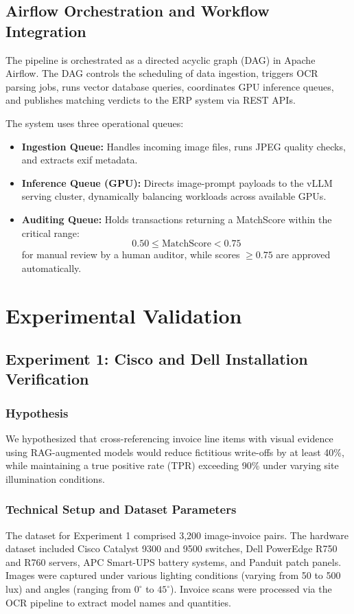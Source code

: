 \documentclass[11pt,letterpaper]{report}
\begin{document}
\section{Airflow Orchestration and Workflow Integration}

The pipeline is orchestrated as a directed acyclic graph (DAG) in Apache Airflow. The DAG controls the scheduling of data ingestion, triggers OCR parsing jobs, runs vector database queries, coordinates GPU inference queues, and publishes matching verdicts to the ERP system via REST APIs.

The system uses three operational queues:
\begin{itemize}
    \item \textbf{Ingestion Queue:} Handles incoming image files, runs JPEG quality checks, and extracts exif metadata.
    \item \textbf{Inference Queue (GPU):} Directs image-prompt payloads to the vLLM serving cluster, dynamically balancing workloads across available GPUs.
    \item \textbf{Auditing Queue:} Holds transactions returning a MatchScore within the critical range:
    \[
    0.50 \le \text{MatchScore} < 0.75
    \]
    for manual review by a human auditor, while scores $\ge 0.75$ are approved automatically.
\end{itemize}

\chapter{Experimental Validation}

\section{Experiment 1: Cisco and Dell Installation Verification}

\subsection{Hypothesis}
We hypothesized that cross-referencing invoice line items with visual evidence using RAG-augmented models would reduce fictitious write-offs by at least 40\%, while maintaining a true positive rate (TPR) exceeding 90\% under varying site illumination conditions.

\subsection{Technical Setup and Dataset Parameters}
The dataset for Experiment 1 comprised 3,200 image-invoice pairs. The hardware dataset included Cisco Catalyst 9300 and 9500 switches, Dell PowerEdge R750 and R760 servers, APC Smart-UPS battery systems, and Panduit patch panels. 
Images were captured under various lighting conditions (varying from 50 to 500 lux) and angles (ranging from $0^\circ$ to $45^\circ$). Invoice scans were processed via the OCR pipeline to extract model names and quantities.
\end{document}

